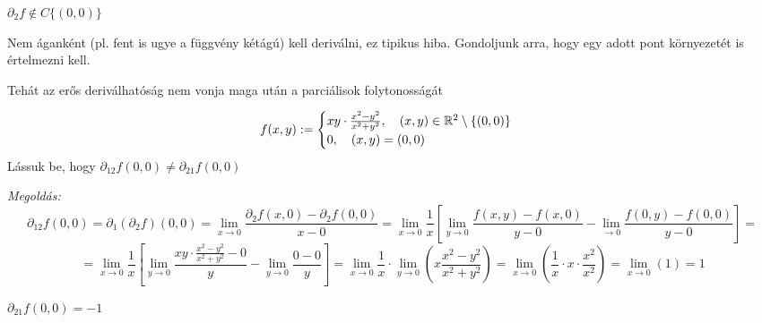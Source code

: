 \documentclass[a4paper,11.5pt]{article}
\begin{document}
	\begin{exercise}
		$\partial_2f\notin C\{(0,0)\}$
	\end{exercise}
	\begin{note}
		Nem áganként (pl. fent is ugye a függvény kétágú) kell deriválni, ez tipikus hiba. Gondoljunk arra, hogy egy adott pont környezetét is értelmezni kell.
	\end{note}
	\begin{note}
		Tehát az erős deriválhatóság nem vonja maga után a parciálisok folytonosságát
	\end{note}
	\begin{task}
		\[ f(x,y):=\begin{cases}
			xy\cdot\frac{x^2-y^2}{x^2+y^2},\quad (x,y)\in \mathbb{R}^2\setminus\{(0,0)\}\\
			0,\quad (x,y)=(0,0)
		\end{cases} \]
		Lássuk be, hogy $\partial_{12}f(0,0)\not=\partial_{21}f(0,0)$
		
		\textit{Megoldás:}
		\[ \partial_{12}f(0,0)=\partial_1(\partial_2f)(0,0)=\lim_{x\to0}\frac{\partial_2f(x,0)-\partial_2f(0,0)}{x-0}=\lim_{x\to0}\frac{1}{x}\left[\lim_{y\to0}\frac{f(x,y)-f(x,0)}{y-0}-\lim_{\to0}\frac{f(0,y)-f(0,0)}{y-0}\right]= \]
		\[= \lim_{x\to0}\frac{1}{x}\left[\lim_{y\to0}\frac{xy\cdot\frac{x^2-y^2}{x^2+y^2}-0}{y}-\lim_{y\to0}\frac{0-0}{y}\right]=\lim_{x\to0}\frac{1}{x}\cdot\lim_{y\to0}\left(x\frac{x^2-y^2}{x^2+y^2}\right)=\lim_{x\to0}\left(\frac{1}{x}\cdot x\cdot\frac{x^2}{x^2}\right)=\lim_{x\to0}(1)=1 \]
	\end{task}
	\begin{exercise}
		$\partial_{21}f(0,0)=-1$
	\end{exercise}
\end{document}

